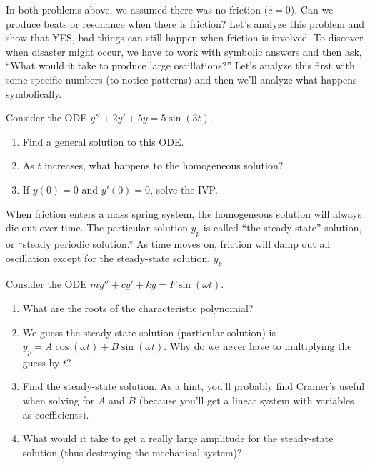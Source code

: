 In both problems above, we assumed there was no friction ($c=0$).  Can we produce beats or resonance when there is friction? Let's analyze this problem and show that YES, bad things can still happen when friction is involved. To discover when disaster might occur, we have to work with symbolic answers and then ask, ``What would it take to produce large oscillations?''  Let's analyze this first with some specific numbers (to notice patterns) and then we'll analyze what happens symbolically.
\begin{problem}
Consider the ODE $y''+2y'+5y=5\sin(3 t)$.
\begin{enumerate}
 \item Find a general solution to this ODE.  
 \item As $t$ increases, what happens to the homogeneous solution?
 \item If $y(0)=0$ and $y'(0)=0$, solve the IVP.
\end{enumerate}
\end{problem}

When friction enters a mass spring system, the homogeneous solution will always die out over time. The particular solution $y_p$ is called ``the steady-state'' solution, or ``steady periodic solution.'' As time moves on, friction will damp out all oscillation except for the steady-state solution, $y_p$.  

\begin{problem}
Consider the ODE $my''+cy'+ky=F\sin(\omega t)$.
\begin{enumerate}
 \item What are the roots of the characteristic polynomial?
 \item We guess the steady-state solution (particular solution) is $y_p=A\cos(\omega t)+B\sin(\omega t)$.  Why do we never have to multiplying the guess by $t$?
 \item Find the steady-state solution. As a hint, you'll probably find Cramer's useful when solving for $A$ and $B$ (because you'll get a linear system with variables as coefficients). 
 \item What would it take to get a really large amplitude for the steady-state solution (thus destroying the mechanical system)?
\end{enumerate}
 
\end{problem}
  

